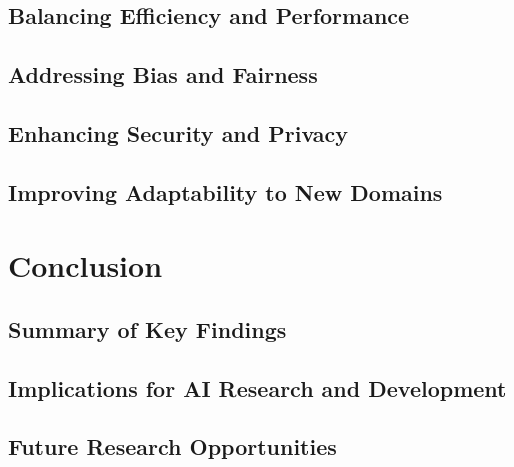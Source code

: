 \documentclass{book}
\begin{document}
\section{Balancing Efficiency and Performance}
\section{Addressing Bias and Fairness}
\section{Enhancing Security and Privacy}
\section{Improving Adaptability to New Domains}

\chapter{Conclusion}
\section{Summary of Key Findings}
\section{Implications for AI Research and Development}
\section{Future Research Opportunities}

\backmatter


\end{document}
